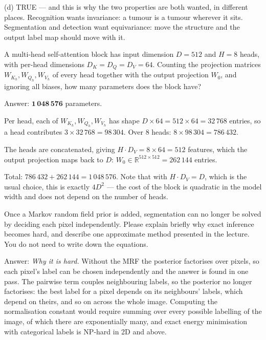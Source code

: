 \documentclass[11pt]{exam}
\newcommand{\answerspace}[1]{\ifprintanswers\else\vspace{#1}\fi}
\begin{document}
\begin{questions}
\begin{solution}
  (d) TRUE --- and this is why the two properties are both wanted, in different places.
  Recognition wants invariance: a tumour is a tumour wherever it sits. Segmentation and detection
  want equivariance: move the structure and the output label map should move with it.
\end{solution}

\question
A multi-head self-attention block has input dimension $D = 512$ and $H = 8$ heads, with per-head
dimensions $D_K = D_Q = D_V = 64$. Counting the projection matrices $W_{K_h}, W_{Q_h}, W_{V_h}$ of
every head together with the output projection $W_0$, and ignoring all biases, how many parameters
does the block have?

\begin{solution}
  Answer: $\mathbf{1\,048\,576}$ parameters.

  Per head, each of $W_{K_h}, W_{Q_h}, W_{V_h}$ has shape $D \times 64 = 512 \times 64 = 32\,768$
  entries, so a head contributes $3 \times 32\,768 = 98\,304$. Over 8 heads:
  $8 \times 98\,304 = 786\,432$.

  The heads are concatenated, giving $H \cdot D_V = 8 \times 64 = 512$ features, which the output
  projection maps back to $D$: $W_0 \in \mathbb{R}^{512 \times 512} = 262\,144$ entries.

  Total: $786\,432 + 262\,144 = 1\,048\,576$. Note that with $H \cdot D_V = D$, which is the usual
  choice, this is exactly $4D^2$ --- the cost of the block is quadratic in the model width and does
  not depend on the number of heads.
\end{solution}
\answerspace{4.0cm}

\question
Once a Markov random field prior is added, segmentation can no longer be solved by deciding each
pixel independently. Please explain briefly why exact inference becomes hard, and describe one
approximate method presented in the lecture. You do not need to write down the equations.

\begin{solution}
  Answer: \emph{Why it is hard.} Without the MRF the posterior factorises over pixels, so each
  pixel's label can be chosen independently and the answer is found in one pass. The pairwise term
  couples neighbouring labels, so the posterior no longer factorises: the best label for a pixel
  depends on its neighbours' labels, which depend on theirs, and so on across the whole image.
  Computing the normalisation constant would require summing over every possible labelling of the
  image, of which there are exponentially many, and exact energy minimisation with categorical
  labels is NP-hard in 2D and above.


\end{solution}
\end{questions}
\end{document}
